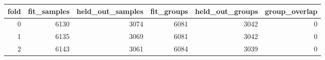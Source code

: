 \begin{tabular}{rrrrrr}
\toprule
fold & fit\_samples & held\_out\_samples & fit\_groups & held\_out\_groups & group\_overlap \\
\midrule
0 & 6130 & 3074 & 6081 & 3042 & 0 \\
1 & 6135 & 3069 & 6081 & 3042 & 0 \\
2 & 6143 & 3061 & 6084 & 3039 & 0 \\
\bottomrule
\end{tabular}
